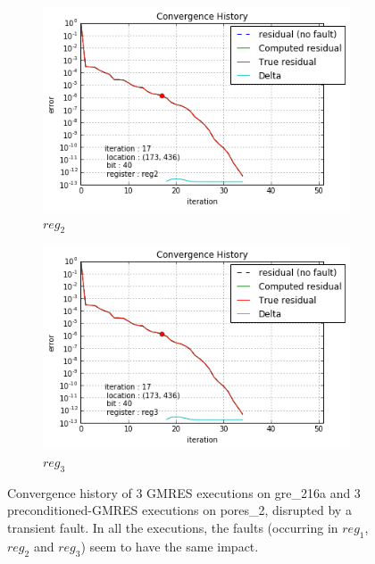 \begin{figure}[h]
\begin{minipage}[b]{0.48\linewidth}
\begin{subfigure}[t]{\linewidth}
		\includegraphics[width=\linewidth]{figures/pores_2/convergence_history_register_1.png}
		\caption{$reg_2$}\label{fig:pores_2_conv_hist_register_1}
	\end{subfigure}
    \quad
    \begin{subfigure}[t]{\linewidth}
		\centering
		\includegraphics[width=\linewidth]{figures/pores_2/convergence_history_register_2.png}
		\caption{$reg_3$}\label{fig:pores_2_conv_hist_register_2}
	\end{subfigure}

    
	\end{minipage}
	\caption{Convergence history of 3 GMRES executions on gre_216a and 3 preconditioned-GMRES executions on pores_2, disrupted by a transient fault. In all the executions, the faults (occurring in $reg_1$, $reg_2$ and $reg_3$) seem to have the same impact.}\label{fig:conv_hist_register}
\end{figure}







